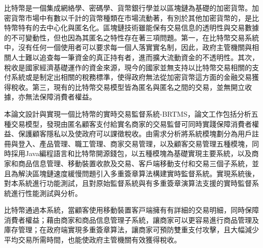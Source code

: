 
\begin{cabstract}

	⽐特幣是⼀個集成網絡學、密碼學、貨幣銀⾏學並以區塊鏈為基礎的加密貨幣。加密貨幣市場中有數以千計的貨幣種類在市場流動著，有別於其他加密貨幣的，是⽐特幣特有的去中⼼化與匿名化。區塊鏈技術雖能保有交易信息的透明性與交易數據的不可變動性，但也因為其匿名之特性存在著三項問題。第一，在⽐特幣交易系統中，沒有任何⼀個使⽤者可以要求每⼀個⼈落實實名制，因此，政府主管機關與相關⼈⼠難以追查每⼀筆資⾦的真正持有者，進⽽擴大流動資金的不透明性。其次，稅收是國家經濟基礎運作的資⾦來源，現今的國家並無⽀持以⽐特幣交易相關的⽀付系統或是制定出相關的稅務標準，使得政府無法從加密貨幣這⽅⾯的⾦融交易獲得稅收。第三，現有的⽐特幣交易模型皆為匿名與匿名之間的交易，並無開⽴收據，亦無法保障消費者權益。

	本論⽂設計與實現⼀個比特幣的實時交易監督系統-BRTMS，論文工作包括分析五種交易模型，發現由匿名顧客支付給實名商家的交易監督可同時實踐保障消費者權益、保護顧客隱私以及使政府可以課徵稅收。由需求分析將系統模塊劃分為用戶註冊與登入、產品管理、職工管理、商家交易管理，以及顧客交易管理五種模塊，同時採用Java編程語言和比特幣開源錢包，以五種模塊為基礎實現主要系統，以及商家和商品信息管理、移動裝置收款及交易、客戶端移動支付和交易三個子系統，並且為解決區塊鏈速度緩慢問題引入多重簽章算法構建實時監督系統。實現系統後，對本系統進行功能測試，且對原始監督系統與有多重簽章演算法支援的實時監督系統進行性能測試與分析。

	比特幣通過本系統，當顧客使用移動裝置客⼾端擁有有詳細的交易明細，同時保障消費者權益；藉由商家和商品信息管理子系統，讓商家可以更容易進⾏商品管理及庫存管理；在政府端實現多重簽章算法，讓商家可預防雙重⽀付攻擊，且大幅減少平均交易所需時間，也能使政府主管機關有效獲得稅收。



\end{cabstract}

